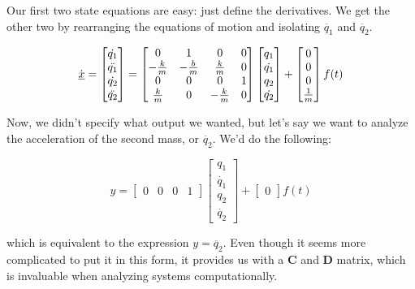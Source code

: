 \documentclass{report}
\begin{document}
\begin{onehalfspacing}
\begin{flushleft}
Our first two state equations are easy: just define the derivatives. We get the other two by rearranging the equations of motion and isolating \(\ddot{q_1}\) and \(\ddot{q_2}\).

\vspace{-0.1in}
\[\dot{\underbar{\(x\)}} = \begin{bmatrix}
    \dot{q_1} \\
    \ddot{q_1} \\
    \dot{q_2} \\ 
    \ddot{q_2}
  \end{bmatrix} = \begin{bmatrix}
    0 & 1 & 0 & 0\\
    -\frac{k}{m} & -\frac{b}{m} & \frac{k}{m} & 0 \\
    0 & 0 & 0 & 1\\
    \frac{k}{m} & 0 & -\frac{k}{m} & 0
\end{bmatrix} \begin{bmatrix}
    q_1 \\
    \dot{q_1} \\
    q_2 \\ 
    \dot{q_2} \end{bmatrix} + \begin{bmatrix}
        0 \\
    0 \\
    0 \\ 
    \frac{1}{m} \end{bmatrix} f(t)\]

Now, we didn't specify what output we wanted, but let's say we want to analyze the acceleration of the second mass, or \(\ddot{q_2}\). We'd do the following:

\vspace{-0.1in}
\[y = \begin{bmatrix} 0 & 0 & 0 & 1\end{bmatrix} \begin{bmatrix}
    q_1 \\
    \dot{q_1} \\
    q_2 \\ 
    \dot{q_2} \end{bmatrix} + \begin{bmatrix} 0 \end{bmatrix} f(t)\]

which is equivalent to the expression \(y = \ddot{q_2}\). Even though it seems more complicated to put it in this form, it provides us with a \textbf{C} and \textbf{D} matrix, which is invaluable when analyzing systems computationally.

\end{flushleft}
\end{onehalfspacing}
\end{document}
